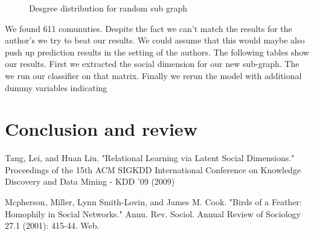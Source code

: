 \documentclass[11pt,letterpaper]{article}
\begin{document}
\begin{figure}[H]
	
	\caption{Desgree distribution for random sub graph}
	\label{fig:fig3}
\end{figure}

We found 611 comunuties. Despite the fact we can't match the results for the author's we try to beat our results. We could assume that this would maybe also push up prediction results in the setting of the authors. The following tables show our results. First we extracted the social dimension for our new sub-graph. The we run our classifier on that matrix. Finally we rerun the model with additional dummy variables indicating 

\section*{Conclusion and review}




\begin{thebibliography}{99} 
	
Tang, Lei, and Huan Liu. "Relational Learning via Latent Social Dimensions." Proceedings of the 15th ACM SIGKDD International Conference on Knowledge Discovery and Data Mining - KDD '09 (2009)

 Mcpherson, Miller, Lynn Smith-Lovin, and James M. Cook. "Birds of a Feather: Homophily in Social Networks." Annu. Rev. Sociol. Annual Review of Sociology 27.1 (2001): 415-44. Web.


\end{thebibliography}
\end{document}
